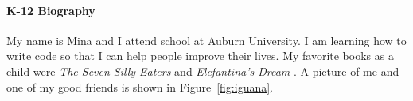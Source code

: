 \documentclass{article}
\begin{document}
\paragraph{K-12 Biography}

My name is Mina and I attend school at Auburn University. I am learning how to write code so that I can help people improve their lives. My favorite books as a child were \textit{The Seven Silly Eaters} \citep{eaters} and \textit{Elefantina's Dream} \citep{elephant}.  A picture of me and one of my good friends is shown in Figure~\ref{fig:iguana}.






\end{document}
